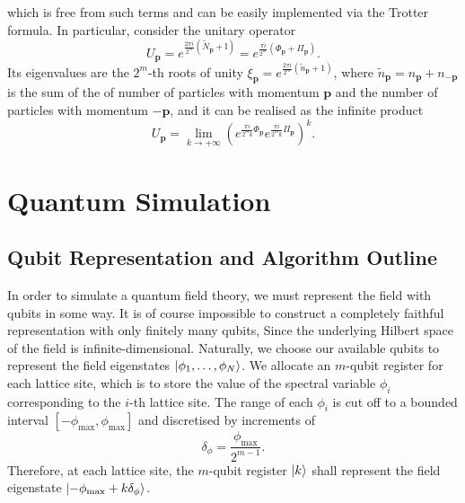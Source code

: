 \documentclass[a4paper,10pt]{report}
\begin{document}
which is free from such terms and can be easily implemented via the Trotter formula. In particular, consider the unitary operator
\begin{equation}
U_\mathbf{p} = e^{\frac{2\pi i}{2^m}(\widetilde{N}_\mathbf{p}+\mathbb{I})} = e^{\frac{\pi i}{2^m}(\Phi_\mathbf{p}+\Pi_\mathbf{p})}.
\end{equation}
Its eigenvalues are the $2^m$-th roots of unity $\xi_\mathbf{p} = e^{\frac{2\pi i}{2^m}(\widetilde{n}_\mathbf{p}+1)}$,  where $\widetilde{n}_\mathbf{p} = n_\mathbf{p} + n_\mathbf{-p}$ is the sum of the of number of particles with momentum $\mathbf{p}$ and the number of particles with momentum $\mathbf{-p}$, and it can be realised as the infinite product
\begin{equation}
U_\mathbf{p} = \lim_{k\rightarrow+\infty}(e^{\frac{\pi i}{2^mk}\Phi_\mathbf{p}}e^{\frac{\pi i}{2^mk}\Pi_\mathbf{p}})^k.
\end{equation}

\chapter{Quantum Simulation}
\section{Qubit Representation and Algorithm Outline}
In order to simulate a quantum field theory, we must represent the field with qubits in some way. It is of course impossible to construct a completely faithful representation with only finitely many qubits, Since the underlying Hilbert space of the field is infinite-dimensional. 
Naturally, we choose our available qubits to represent the field eigenstates $\ket{\phi_1,\dots,\phi_N}$. We allocate an $m$-qubit register for each lattice site, which is to store the value of the spectral variable $\phi_i$ corresponding to the $i$-th lattice site. The range of each $\phi_i$ is cut off to a bounded interval $[-\phi_\mathrm{max},\phi_\mathrm{max}]$ and discretised by increments of
\begin{equation}
\delta_\phi = \frac{\phi_\mathrm{max}}{2^{m-1}}.
\end{equation}
Therefore, at each lattice site, the $m$-qubit register $\ket{k}$ shall represent the field eigenstate $\ket{-\phi_\mathrm{max}+k\delta_\phi}$. 
\end{document}
